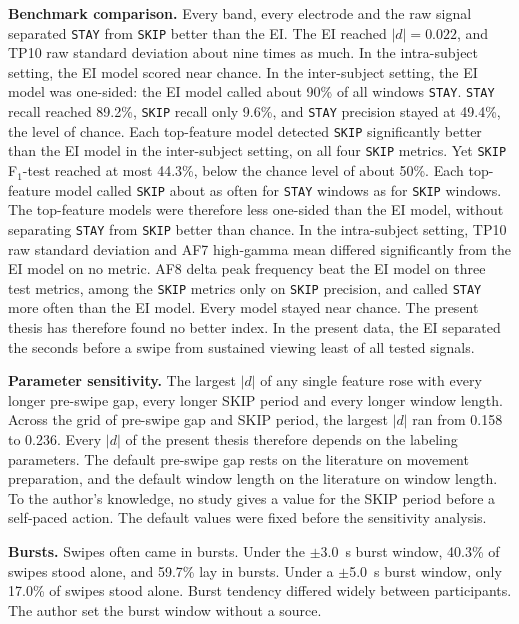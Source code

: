 \documentclass[12pt,a4paper]{report}
\begin{document}
\textbf{Benchmark comparison.} Every band, every electrode and the raw signal separated \texttt{STAY} from \texttt{SKIP} better than the EI. The EI reached \(|d| = 0.022\), and TP10 raw standard deviation about nine times as much. In the intra-subject setting, the EI model scored near chance. In the inter-subject setting, the EI model was one-sided: the EI model called about 90\% of all windows \texttt{STAY}. \texttt{STAY} recall reached 89.2\%, \texttt{SKIP} recall only 9.6\%, and \texttt{STAY} precision stayed at 49.4\%, the level of chance. Each top-feature model detected \texttt{SKIP} significantly better than the EI model in the inter-subject setting, on all four \texttt{SKIP} metrics. Yet \texttt{SKIP} F\(_1\)-test reached at most 44.3\%, below the chance level of about 50\%. Each top-feature model called \texttt{SKIP} about as often for \texttt{STAY} windows as for \texttt{SKIP} windows. The top-feature models were therefore less one-sided than the EI model, without separating \texttt{STAY} from \texttt{SKIP} better than chance. In the intra-subject setting, TP10 raw standard deviation and AF7 high-gamma mean differed significantly from the EI model on no metric. AF8 delta peak frequency beat the EI model on three test metrics, among the \texttt{SKIP} metrics only on \texttt{SKIP} precision, and called \texttt{STAY} more often than the EI model. Every model stayed near chance. The present thesis has therefore found no better index. In the present data, the EI separated the seconds before a swipe from sustained viewing least of all tested signals.

\textbf{Parameter sensitivity.} The largest \(|d|\) of any single feature rose with every longer pre-swipe gap, every longer SKIP period and every longer window length. Across the grid of pre-swipe gap and SKIP period, the largest \(|d|\) ran from 0.158 to 0.236. Every \(|d|\) of the present thesis therefore depends on the labeling parameters. The default pre-swipe gap rests on the literature on movement preparation, and the default window length on the literature on window length. To the author's knowledge, no study gives a value for the SKIP period before a self-paced action. The default values were fixed before the sensitivity analysis.

\textbf{Bursts.} Swipes often came in bursts. Under the \(\pm\)3.0~s burst window, 40.3\% of swipes stood alone, and 59.7\% lay in bursts. Under a \(\pm\)5.0~s burst window, only 17.0\% of swipes stood alone. Burst tendency differed widely between participants. The author set the burst window without a source.
\end{document}
